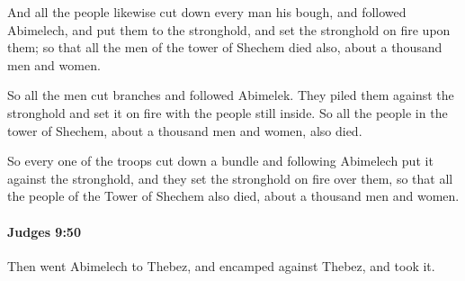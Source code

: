 			\begin{versebox}
					\item[BHS] 
					\item[ASV] And all the people likewise cut down every man his bough, and followed Abimelech, and put them to the stronghold, and set the stronghold on fire upon them; so that all the men of the tower of Shechem died also, about a thousand men and women.
					\item[NIV] So all the men cut branches and followed Abimelek. They piled them against the stronghold and set it on fire with the people still inside. So all the people in the tower of Shechem, about a thousand men and women, also died.
					\item[NRSV] So every one of the troops cut down a bundle and following Abimelech put it against the stronghold, and they set the stronghold on fire over them, so that all the people of the Tower of Shechem also died, about a thousand men and women.
			\end{versebox}

		\paragraph{Judges 9:50} %
			\label{JUDGES-9-50}

			Then went Abimelech to Thebez, and encamped against Thebez, and took it.

